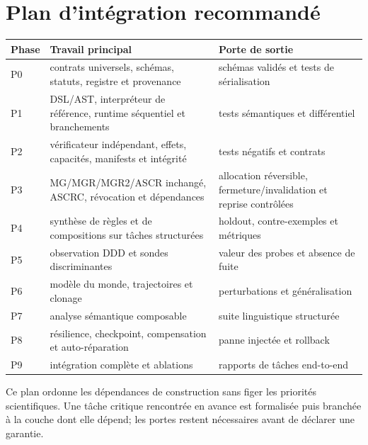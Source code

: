 \documentclass[11pt,a4paper]{article}
\begin{document}
\section{Plan d'intégration recommandé}
\begin{longtable}{p{}p{}p{}}
\toprule Phase & Travail principal & Porte de sortie \\
\midrule
P0 & contrats universels, schémas, statuts, registre et provenance & schémas validés et tests de sérialisation \\
P1 & DSL/AST, interpréteur de référence, runtime séquentiel et branchements & tests sémantiques et différentiel \\
P2 & vérificateur indépendant, effets, capacités, manifests et intégrité & tests négatifs et contrats \\
P3 & MG/MGR/MGR2/ASCR inchangé, ASCRC, révocation et dépendances & allocation réversible, fermeture/invalidation et reprise contrôlées \\
P4 & synthèse de règles et de compositions sur tâches structurées & holdout, contre-exemples et métriques \\
P5 & observation DDD et sondes discriminantes & valeur des probes et absence de fuite \\
P6 & modèle du monde, trajectoires et clonage & perturbations et généralisation \\
P7 & analyse sémantique composable & suite linguistique structurée \\
P8 & résilience, checkpoint, compensation et auto-réparation & panne injectée et rollback \\
P9 & intégration complète et ablations & rapports de tâches end-to-end \\
\bottomrule
\end{longtable}
Ce plan ordonne les dépendances de construction sans figer les priorités scientifiques. Une tâche critique rencontrée en avance est formalisée puis branchée à la couche dont elle dépend; les portes restent nécessaires avant de déclarer une garantie.
\end{document}
